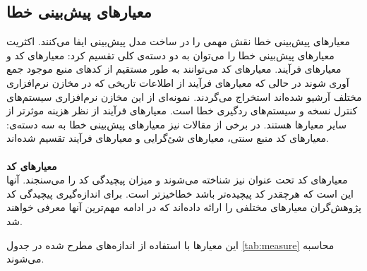 \subsection{معیارهای پیش‌بینی خطا}
\label{subsec:metrics}
معیارهای پیش‌بینی خطا نقش مهمی را در ساخت مدل پیش‌بینی ایفا می‌کنند. اکثریت معیارهای پیش‌بینی خطا را می‌توان به دو دسته‌ی  کلی تقسیم کرد: معیارهای کد و معیارهای فرآیند. معیارهای کد می‌توانند به طور مستقیم از کدهای منبع موجود جمع آوری شوند در حالی که معیارهای فرآیند  از اطلاعات تاریخی که در مخازن نرم‌افزاری مختلف آرشیو شده‌اند استخراج می‌گردند. نمونه‌ای از این مخازن نرم‌افزاری سیستم‌های کنترل نسخه و سیستم‌های ردگیری خطا است. معیار‌های فرآیند از نظر هزینه موثرتر از سایر معیارها هستند\cite{arisholm2010systematic}. در برخی از مقالات نیز معیارهای  پیش‌بینی خطا به سه دسته‌ی: معیارهای کد منبع سنتی، معیارهای شئ‌گرایی و معیارهای فرآیند تقسیم شده‌اند\cite{radjenovic2013software}.\\\\
\textbf{معیارهای کد} \\

معیارهای کد تحت عنوان  نیز شناخته می‌شوند و میزان پیچیدگی کد را می‌سنجند.  آنها این است که هرچقدر کد پیچیده‌تر باشد خطا‌خیز‌تر است. برای اندازه‌گیری پیچیدگی کد پژوهش‌گران معیار‌های مختلفی را ارائه داده‌اند که در ادامه مهم‌ترین آنها معرفی خواهند شد. 

این معیارها با استفاده از اندازه‌های مطرح شده در جدول \ref{tab:measure} محاسبه می‌شوند. 

